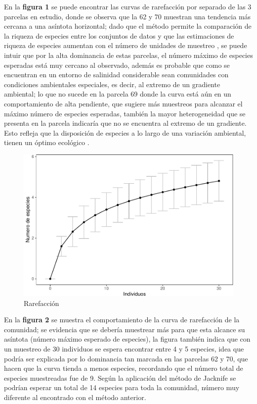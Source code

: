 \documentclass[conference,final,12pt,]{IEEEtran}
\makeatletter
\def\maxwidth{\ifdim\Gin@nat@width>\linewidth\linewidth
\else\Gin@nat@width\fi}
\let\Oldincludegraphics\includegraphics
\renewcommand{\includegraphics}[1]{\Oldincludegraphics[width=\maxwidth]{#1}}
\makeatother
\begin{document}
En la \textbf{figura 1} se puede encontrar las
curvas de rarefacción por separado de las 3 parcelas en estudio, donde
se observa que la 62 y 70 muestran una tendencia más cercana a una
asíntota horizontal; dado que el método permite la comparación de la
riqueza de especies entre los conjuntos de datos \citep{AM} y que las
estimaciones de riqueza de especies aumentan con el número de unidades
de muestreo \citep{AN}, se puede intuir que por la alta dominancia de
estas parcelas, el número máximo de especies esperadas está muy cercano
al observado, además es probable que como se encuentran en un entorno de
salinidad considerable sean comunidades con condiciones ambientales
especiales, es decir, al extremo de un gradiente ambiental; lo que no
sucede en la parcela 69 donde la curva está aún en un comportamiento de
alta pendiente, que sugiere más muestreos para alcanzar el máximo número
de especies esperadas, también la mayor heterogeneidad que se presenta en la
parcela indicaría que no se encuentra al extremo de un gradiente. Esto
refleja que la disposición de especies a lo largo de una variación
ambiental, tienen un óptimo ecológico \citep{AO}.

\begin{figure}[htb]
\centering
\includegraphics{mangrove_files/figure-latex/unnamed-chunk-6-1.pdf}
\caption{Rarefacción}
\end{figure}

En la \textbf{figura 2} se muestra el comportamiento de la curva de
rarefacción de la comunidad; se evidencia que se debería
muestrear más para que esta alcance su asíntota (número máximo esperado
de especies), la figura también indica que con un muestreo de 30
individuos se espera encontrar entre 4 y 5 especies, idea que podría ser
explicada por lo dominancia tan marcada en las parcelas
62 y 70, que hacen que la curva tienda a menos especies, recordando que
el número total de especies muestreadas fue de 9. Según la aplicación
del método de Jacknife se podrían esperar un total de 14 especies para
toda la comunidad, número muy diferente al encontrado con el
método anterior. 
\end{document}
